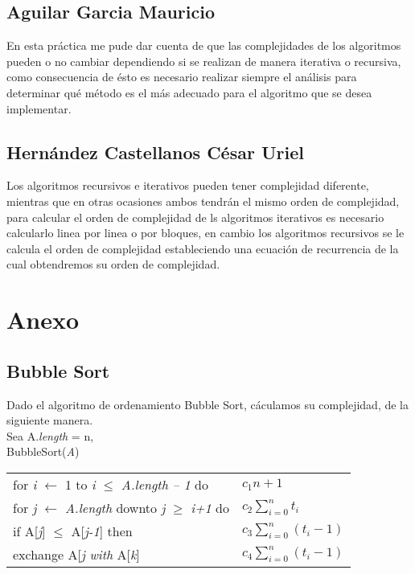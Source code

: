 \documentclass[12pt,twoside]{article}
\begin{document}
\subsection*{Aguilar Garcia Mauricio}
 En esta práctica me pude dar cuenta de que las complejidades de los algoritmos pueden o no cambiar dependiendo si se realizan de manera iterativa o recursiva, como consecuencia de ésto es necesario realizar siempre el análisis para determinar qué método es el más adecuado para el algoritmo que se desea implementar.

\subsection*{Hernández Castellanos César Uriel}
Los algoritmos recursivos e iterativos pueden tener complejidad diferente, mientras que en otras ocasiones ambos tendrán el mismo orden de complejidad, para calcular el orden de complejidad de ls algoritmos iterativos es necesario calcularlo linea por linea o por bloques, en cambio los algoritmos recursivos se le calcula el orden de complejidad estableciendo una ecuación de recurrencia de la cual obtendremos su orden de complejidad.\\

\vspace{200 mm}

\section{Anexo}
\subsection{Bubble Sort}
	Dado el algoritmo de ordenamiento Bubble Sort, c\'{a}culamos su complejidad, de la siguiente manera.\\
	Sea A.\emph{length} = n,\\
	\hspace*{1cm}BubbleSort(\emph{A})\\
	\begin{tabular}{l l}
	\hspace*{1cm}for \emph{i} $ \leftarrow$ 1	 to \emph{i} $\leq$ \emph{A.length -- 1} do
	&$c_{1}$\hspace*{0.5cm}$n+1$\\
	\hspace*{1.5cm}for \emph{j} $ \leftarrow$ \emph{A.\emph{length}} downto \emph{j} $\geq$ \emph{i+1} do
	&$c_{2}$\hspace*{0.5cm}$\displaystyle\sum_{i=0}^{n}t_i$\\
	\hspace*{2cm}if A[\emph{j}] $\leq$ A[\emph{j-1}] then
	&$c_{3}$\hspace*{0.5cm}$\displaystyle\sum_{i=0}^{n}(t_i-1)$\\
	\hspace*{2.5cm}exchange A[\emph{j} \emph{with} A[\emph{k}]
	&$c_{4}$\hspace*{0.5cm}$\displaystyle\sum_{i=0}^{n}(t_i-1)$\\
	\end{tabular}
	
\end{document}
